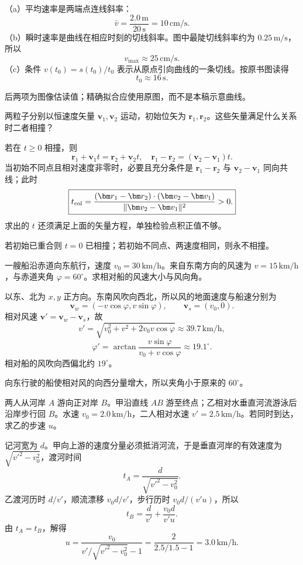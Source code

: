 \exsolution
（a）平均速率是两端点连线斜率：
\[
\boxed{\bar v=\frac{2.0\,\mathrm m}{20\,\mathrm s}
=10\,\mathrm{cm/s}.}
\]
（b）瞬时速率是曲线在相应时刻的切线斜率。图中最陡切线斜率约为 $0.25\,\mathrm{m/s}$，所以
\[\boxed{v_{\max}\approx25\,\mathrm{cm/s}.}\]
（c）条件 $v(t_0)=s(t_0)/t_0$ 表示从原点引向曲线的一条切线。按原书图读得
\[\boxed{t_0\approx16\,\mathrm s.}\]

\excheck
后两项为图像估读值；精确拟合应使用原图，而不是本稿示意曲线。


两粒子分别以恒速度矢量 $\bm v_1,\bm v_2$ 运动，初始位矢为 $\bm r_1,\bm r_2$。这些矢量满足什么关系时二者相撞？

\exsolution
若在 $t\ge0$ 相撞，则
\[
\bm r_1+\bm v_1t=\bm r_2+\bm v_2t,
\quad \bm r_1-\bm r_2=(\bm v_2-\bm v_1)t.
\]
当初始不同点且相对速度非零时，必要且充分条件是 $\bm r_1-\bm r_2$ 与 $\bm v_2-\bm v_1$ 同向共线；此时
\[
\boxed{t_{\rm col}=\frac{(\bm r_1-\bm r_2)\cdot(\bm v_2-\bm v_1)}
{\lVert\bm v_2-\bm v_1\rVert^2}>0.}
\]
求出的 $t$ 还须满足上面的矢量方程，单独检验点积正值不够。

\excheck
若初始已重合则 $t=0$ 已相撞；若初始不同点、两速度相同，则永不相撞。


一艘船沿赤道向东航行，速度 $v_0=30\,\mathrm{km/h}$。来自东南方向的风速为 $v=15\,\mathrm{km/h}$，与赤道夹角 $\varphi=60^\circ$。求相对船的风速大小与风向角。

\exsolution
以东、北为 $x,y$ 正方向。东南风吹向西北，所以风的地面速度与船速分别为
\[
\bm v_w=(-v\cos\varphi,v\sin\varphi),\qquad \bm v_s=(v_0,0).
\]
相对风速 $\bm v'=\bm v_w-\bm v_s$，故
\[
\boxed{v'=\sqrt{v_0^2+v^2+2v_0v\cos\varphi}
\approx39.7\,\mathrm{km/h}},
\]
\[
\boxed{\varphi'=\arctan\frac{v\sin\varphi}{v_0+v\cos\varphi}
\approx19.1^\circ}.
\]
相对船的风吹向西偏北约 $19^\circ$。

\excheck
向东行驶的船使相对风的向西分量增大，所以夹角小于原来的 $60^\circ$。


两人从河岸 $A$ 游向正对岸 $B$。甲沿直线 $AB$ 游至终点；乙相对水垂直河流游泳后沿岸步行回 $B$。水速 $v_0=2.0\,\mathrm{km/h}$，二人相对水速 $v'=2.5\,\mathrm{km/h}$。若同时到达，求乙的步速 $u$。

\exsolution
记河宽为 $d$。甲向上游的速度分量必须抵消河流，于是垂直河岸的有效速度为 $\sqrt{v'^2-v_0^2}$，渡河时间
\[
t_A=\frac d{\sqrt{v'^2-v_0^2}}.
\]
乙渡河历时 $d/v'$，顺流漂移 $v_0d/v'$，步行历时 $v_0d/(v'u)$，所以
\[
t_B=\frac d{v'}+\frac{v_0d}{v'u}.
\]
由 $t_A=t_B$，解得
\[
\boxed{u=\frac{v_0}{v'/\sqrt{v'^2-v_0^2}-1}
=\frac{2}{2.5/1.5-1}=3.0\,\mathrm{km/h}.}
\]

